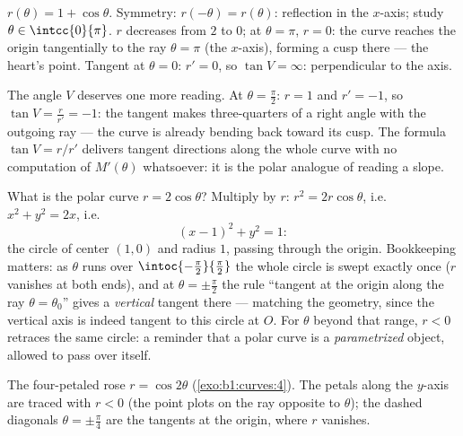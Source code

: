 \begin{example}\label{ex:b1:curves:cardioid}
$r(\theta) = 1 + \cos\theta$. Symmetry: $r(-\theta)
= r(\theta)$: reflection in the $x$-axis; study $\theta \in
\intcc{0}{\pi}$. $r$ decreases from $2$ to $0$; at $\theta = \pi$,
$r = 0$: the curve reaches the origin tangentially to the ray
$\theta = \pi$ (the $x$-axis), forming a cusp there --- the heart's
point. Tangent at $\theta = 0$: $r' = 0$, so $\tan V = \infty$:
perpendicular to the axis.

The angle $V$ deserves one more reading. At $\theta =
\frac\pi2$: $r = 1$ and $r' = -1$, so $\tan V = \frac{r}{r'} =
-1$: the tangent makes three-quarters of a right angle with the
outgoing ray --- the curve is already bending back toward its
cusp. The formula $\tan V = r/r'$ delivers tangent directions
along the whole curve with no computation of $M'(\theta)$
whatsoever: it is the polar analogue of reading a slope.
\end{example}

\begin{example}
\label{ex:b1:curves:polarcircle}
What is the polar curve $r = 2\cos\theta$? Multiply by $r$:
$r^2 = 2r\cos\theta$, i.e.\ $x^2 + y^2 = 2x$, i.e.
\[
(x - 1)^2 + y^2 = 1 :
\]
the circle of center $(1, 0)$ and radius $1$, passing through
the origin. Bookkeeping matters: as $\theta$ runs over
$\intoc{-\frac\pi2}{\frac\pi2}$ the whole circle is swept
exactly once ($r$ vanishes at both ends), and at $\theta =
\pm\frac\pi2$ the rule ``tangent at the origin along the ray
$\theta = \theta_0$'' gives a \emph{vertical} tangent there ---
matching the geometry, since the vertical axis is indeed tangent
to this circle at $O$. For $\theta$ beyond that range, $r < 0$
retraces the same circle: a reminder that a polar curve is a
\emph{parametrized} object, allowed to pass over itself.
\end{example}

\begin{omfigure}

{\small The four-petaled rose $r = \cos 2\theta$
(\cref{exo:b1:curves:4}). The petals along the $y$-axis are
traced with $r < 0$ (the point plots on the ray opposite to
$\theta$); the dashed diagonals $\theta = \pm\frac\pi4$ are the
tangents at the origin, where $r$ vanishes.}
\end{omfigure}

